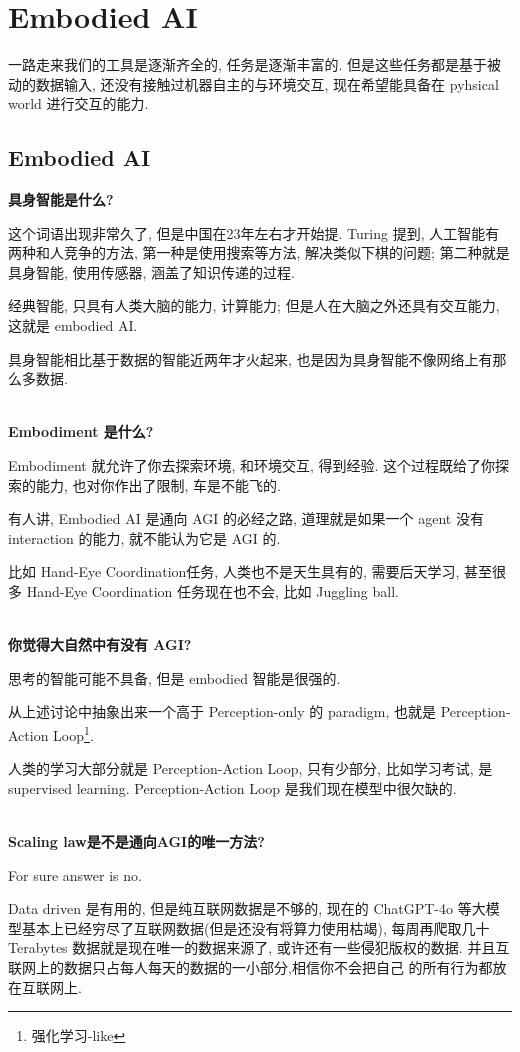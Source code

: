 \chapter{Embodied AI}

一路走来我们的工具是逐渐齐全的, 任务是逐渐丰富的. 但是这些任务都是基于被动的数据输入,
还没有接触过机器自主的与环境交互, 现在希望能具备在 pyhsical world 进行交互的能力.

\section{Embodied AI}

\textbf{具身智能是什么?}

这个词语出现非常久了, 但是中国在23年左右才开始提.
Turing 提到, 人工智能有两种和人竞争的方法, 第一种是使用搜索等方法, 解决类似下棋的问题; 
第二种就是具身智能, 使用传感器, 涵盖了知识传递的过程.

经典智能, 只具有人类大脑的能力, 计算能力; 但是人在大脑之外还具有交互能力, 这就是 embodied AI.

具身智能相比基于数据的智能近两年才火起来, 也是因为具身智能不像网络上有那么多数据.

\textbf{\\Embodiment 是什么?}

Embodiment 就允许了你去探索环境, 和环境交互, 得到经验. 
这个过程既给了你探索的能力, 也对你作出了限制, 车是不能飞的.

有人讲, Embodied AI 是通向 AGI 的必经之路, 道理就是如果一个 agent 没有interaction 的能力,
就不能认为它是 AGI 的.

比如 Hand-Eye Coordination任务, 人类也不是天生具有的, 需要后天学习, 甚至很多
Hand-Eye Coordination 任务现在也不会, 比如 Juggling ball.

\textbf{\\你觉得大自然中有没有 AGI? }

思考的智能可能不具备, 但是 embodied 智能是很强的.

从上述讨论中抽象出来一个高于 Perception-only 的 paradigm, 
也就是 Perception-Action Loop\footnote{强化学习-like}.

人类的学习大部分就是 Perception-Action Loop, 只有少部分, 比如学习考试, 是 supervised learning.
Perception-Action Loop 是我们现在模型中很欠缺的.

\textbf{\\Scaling law是不是通向AGI的唯一方法?}

For sure answer is no. 

Data driven 是有用的, 但是纯互联网数据是不够的, 现在的
ChatGPT-4o 等大模型基本上已经穷尽了互联网数据(但是还没有将算力使用枯竭), 
每周再爬取几十 Terabytes 数据就是现在唯一的数据来源了,
或许还有一些侵犯版权的数据. 并且互联网上的数据只占每人每天的数据的一小部分,相信你不会把自己
的所有行为都放在互联网上.

